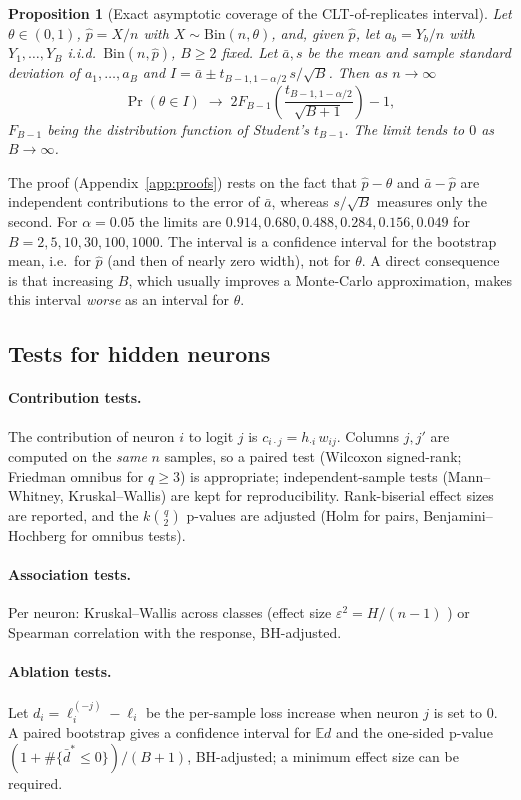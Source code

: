\documentclass[11pt,a4paper]{article}
\newtheorem{proposition}{Proposition}
\theoremstyle{remark}\newtheorem{remark}{Remark}
\begin{document}
\begin{proposition}[Exact asymptotic coverage of the CLT-of-replicates interval]\label{prop:clt}
Let $\theta\in(0,1)$, $\hat p=X/n$ with $X\sim\mathrm{Bin}(n,\theta)$, and, given $\hat p$, let $a_b=Y_b/n$ with $Y_1,\dots,Y_B$ i.i.d.\ $\mathrm{Bin}(n,\hat p)$, $B\ge2$ fixed. Let $\bar a,s$ be the mean and sample standard deviation of $a_1,\dots,a_B$ and $I=\bar a\pm t_{B-1,1-\alpha/2}\,s/\sqrt B$. Then as $n\to\infty$
\[
\Pr(\theta\in I)\;\longrightarrow\;2F_{B-1}\!\left(\frac{t_{B-1,1-\alpha/2}}{\sqrt{B+1}}\right)-1,
\]
$F_{B-1}$ being the distribution function of Student's $t_{B-1}$. The limit tends to $0$ as $B\to\infty$.
\end{proposition}
The proof (Appendix~\ref{app:proofs}) rests on the fact that $\hat p-\theta$ and $\bar a-\hat p$ are independent contributions to the error of $\bar a$, whereas $s/\sqrt B$ measures only the second. For $\alpha=0.05$ the limits are $0.914,0.680,0.488,0.284,0.156,0.049$ for $B=2,5,10,30,100,1000$. The interval is a confidence interval for the bootstrap mean, i.e.\ for $\hat p$ (and then of nearly zero width), not for $\theta$. A direct consequence is that increasing $B$, which usually improves a Monte-Carlo approximation, makes this interval \emph{worse} as an interval for $\theta$.

\subsection{Tests for hidden neurons}
\paragraph{Contribution tests.} The contribution of neuron $i$ to logit $j$ is $c_{i\cdot j}=h_{\cdot i}\,w_{ij}$. Columns $j,j'$ are computed on the \emph{same} $n$ samples, so a paired test (Wilcoxon signed-rank; Friedman omnibus for $q\ge3$) is appropriate; independent-sample tests (Mann--Whitney, Kruskal--Wallis) are kept for reproducibility. Rank-biserial effect sizes are reported, and the $k\binom q2$ p-values are adjusted (Holm for pairs, Benjamini--Hochberg for omnibus tests).
\paragraph{Association tests.} Per neuron: Kruskal--Wallis across classes (effect size $\varepsilon^2=H/(n-1)$ \cite{tomczak2014}) or Spearman correlation with the response, BH-adjusted.
\paragraph{Ablation tests.} Let $d_i=\ell_i^{(-j)}-\ell_i$ be the per-sample loss increase when neuron $j$ is set to $0$. A paired bootstrap gives a confidence interval for $\mathbb E d$ and the one-sided p-value $(1+\#\{\bar d^*\le0\})/(B+1)$, BH-adjusted; a minimum effect size can be required.
\end{document}
